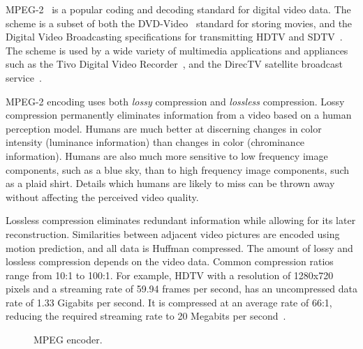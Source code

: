 
MPEG-2~\cite{MPEG2} is a popular coding and decoding standard
for digital video data. The scheme is a subset of both the
DVD-Video~\cite{DVDVideo} standard for storing movies, and the Digital
Video Broadcasting specifications for transmitting HDTV and
SDTV~\cite{DVB}. The scheme is used by a wide variety of multimedia
applications and appliances such as the Tivo Digital Video
Recorder~\cite{tivo}, and the DirecTV satellite broadcast
service~\cite{directv}.

MPEG-2 encoding uses both {\it lossy} compression and {\it lossless}
compression. Lossy compression permanently eliminates information from
a video based on a human perception model. Humans are much better at
discerning changes in color intensity (luminance information) than
changes in color (chrominance information). Humans are also much more
sensitive to low frequency image components, such as a blue sky, than
to high frequency image components, such as a plaid shirt. Details
which humans are likely to miss can be thrown away without affecting
the perceived video quality.

Lossless compression eliminates redundant information while allowing
for its later reconstruction. Similarities between adjacent video
pictures are encoded using motion prediction, and all data is Huffman
compressed\cite{Huffman52}. The amount of lossy and lossless
compression depends on the video data. Common compression ratios range
from 10:1 to 100:1. For example, HDTV with a resolution of 1280x720
pixels and a streaming rate of 59.94 frames per second, has an
uncompressed data rate of 1.33 Gigabits per second. It is compressed at 
an average rate of 66:1, reducing the required streaming rate to
20 Megabits per second~\cite{imagevidstandards, Page 3}.


\begin{figure}[t]
\begin{center}
\vspace{-12pt}
 \caption{MPEG encoder.}
 \label{fig:mpeg-encoder}
\end{center}
\end{figure}

